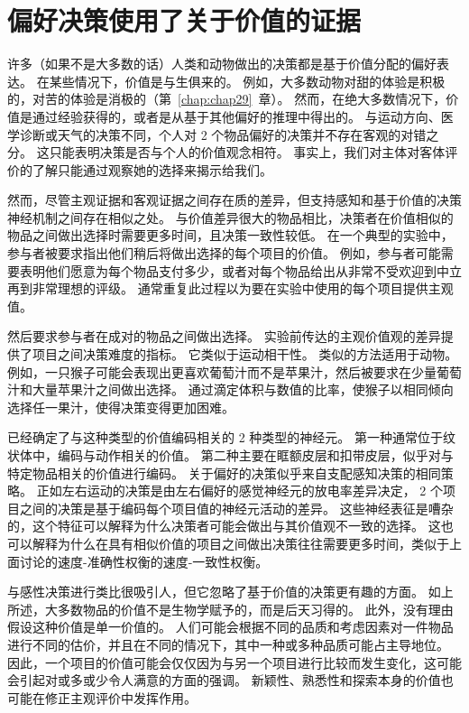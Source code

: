 \section{偏好决策使用了关于价值的证据}

许多（如果不是大多数的话）人类和动物做出的决策都是基于价值分配的偏好表达。 
在某些情况下，价值是与生俱来的。
例如，大多数动物对甜的体验是积极的，对苦的体验是消极的（第~\ref{chap:chap29}~章）。
然而，在绝大多数情况下，价值是通过经验获得的，或者是从基于其他偏好的推理中得出的。
与运动方向、医学诊断或天气的决策不同，个人对 2 个物品偏好的决策并不存在客观的对错之分。
这只能表明决策是否与个人的价值观念相符。
事实上，我们对主体对客体评价的了解只能通过观察她的选择来揭示给我们。


然而，尽管主观证据和客观证据之间存在质的差异，但支持感知和基于价值的决策神经机制之间存在相似之处。
与价值差异很大的物品相比，决策者在价值相似的物品之间做出选择时需要更多时间，且决策一致性较低。
在一个典型的实验中，参与者被要求指出他们稍后将做出选择的每个项目的价值。
例如，参与者可能需要表明他们愿意为每个物品支付多少，或者对每个物品给出从非常不受欢迎到中立再到非常理想的评级。
通常重复此过程以为要在实验中使用的每个项目提供主观值。


然后要求参与者在成对的物品之间做出选择。
实验前传达的主观价值观的差异提供了项目之间决策难度的指标。
它类似于运动相干性。
类似的方法适用于动物。
例如，一只猴子可能会表现出更喜欢葡萄汁而不是苹果汁，然后被要求在少量葡萄汁和大量苹果汁之间做出选择。
通过滴定体积与数值的比率，使猴子以相同倾向选择任一果汁，使得决策变得更加困难。


已经确定了与这种类型的价值编码相关的 2 种类型的神经元。
第一种通常位于纹状体中，编码与动作相关的价值。
第二种主要在眶额皮层和扣带皮层，似乎对与特定物品相关的价值进行编码。
关于偏好的决策似乎来自支配感知决策的相同策略。
正如左右运动的决策是由左右偏好的感觉神经元的放电率差异决定， 2 个项目之间的决策是基于编码每个项目值的神经元活动的差异。
这些神经表征是嘈杂的，这个特征可以解释为什么决策者可能会做出与其价值观不一致的选择。
这也可以解释为什么在具有相似价值的项目之间做出决策往往需要更多时间，类似于上面讨论的速度-准确性权衡的速度-一致性权衡。


与感性决策进行类比很吸引人，但它忽略了基于价值的决策更有趣的方面。
如上所述，大多数物品的价值不是生物学赋予的，而是后天习得的。
此外，没有理由假设这种价值是单一价值的。
人们可能会根据不同的品质和考虑因素对一件物品进行不同的估价，并且在不同的情况下，其中一种或多种品质可能占主导地位。
因此，一个项目的价值可能会仅仅因为与另一个项目进行比较而发生变化，这可能会引起对或多或少令人满意的方面的强调。
新颖性、熟悉性和探索本身的价值也可能在修正主观评价中发挥作用。


